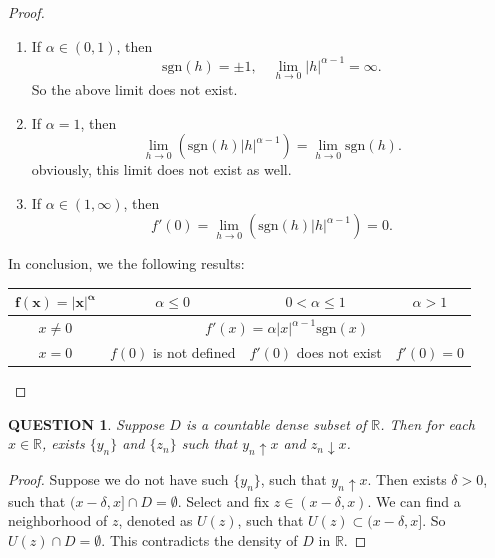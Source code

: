 \documentclass[12pt]{article}
\renewcommand{\(}{\left(}%
\renewcommand{\)}{\right)}%
\renewcommand{\[}{\left[}%
\renewcommand{\]}{\right]}%
\renewcommand{\r}{\mathbb{R}}
\newtheorem{question}{QUESTION}[section]}
\newtheorem{proof}{Proof.}}
\begin{document}
\begin{proof}
\begin{enumerate}
\begin{enumerate}
     \item If $\alpha\in(0,1)$, then
     \begin{equation*}
      \mathrm{sgn}(h)=\pm1,\quad \lim_{h\to0}|h|^{\alpha-1}=\infty.
     \end{equation*}
     So the above limit does not exist.
     \item If $\alpha=1$, then
     \begin{equation*}
      \lim_{h\to0}\(\mathrm{sgn}(h)|h|^{\alpha-1}\)=\lim_{h\to0}\mathrm{sgn}(h).
     \end{equation*}
     obviously, this limit does not exist as well.
     \item If $\alpha\in(1,\infty)$, then
     \begin{equation*}
      f'(0)=\lim_{h\to0}\(\mathrm{sgn}(h)|h|^{\alpha-1}\)=0.
     \end{equation*}
    \end{enumerate}
   \end{enumerate}
   In conclusion, we the following results:
   \begin{table}[h]
    \centering
    \begin{tabular}{|c|c|c|c|}
     \hline
     $\bm{f(x)=|x|^\alpha}$ & $\alpha\leq 0$ & $0<\alpha\leq 1$ & $\alpha>1$ \\
     \hline
     $x\neq 0$ &\multicolumn{3}{|c|}{ $f'(x)=\alpha |x|^{\alpha-1}\mathrm{sgn}(x)$}  \\
     \hline
     $x=0$ & $f(0)$ is not defined  & $f'(0)$ does not exist & $f'(0)=0$\\
     \hline
    \end{tabular}
   \end{table}
  \end{proof}

  \begin{question}
   Suppose $D$ is a countable dense subset of $\r$. Then for each $x\in\r$, exists $\{y_n\}$ and $\{z_n\}$ such that $y_n\uparrow x$ and $z_n\downarrow x$.
  \end{question}
  \begin{proof}
   Suppose we do not have such $\{y_n\}$, such that $y_n\uparrow x$. Then exists $\delta>0$, such that $ (x-\delta,x]\cap D =\emptyset$. Select and fix $z\in (x-\delta,x)$. We can find a neighborhood of $z$, denoted as $U(z)$, such that $U(z)\subset (x-\delta,x]$. So $U(z)\cap D=\emptyset$. This contradicts the density of $D$ in $\r$.
  \end{proof}
\end{document}
